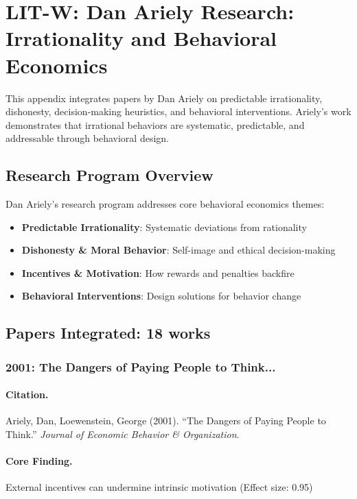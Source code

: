\section{LIT-W: Dan Ariely Research: Irrationality and Behavioral Economics}
\label{app:litw}

This appendix integrates papers by Dan Ariely on predictable irrationality,
dishonesty, decision-making heuristics, and behavioral interventions. Ariely's work demonstrates
that irrational behaviors are systematic, predictable, and addressable through behavioral design.

\subsection{Research Program Overview}

Dan Ariely's research program addresses core behavioral economics themes:

\begin{itemize}
  \item \textbf{Predictable Irrationality}: Systematic deviations from rationality
  \item \textbf{Dishonesty & Moral Behavior}: Self-image and ethical decision-making
  \item \textbf{Incentives & Motivation}: How rewards and penalties backfire
  \item \textbf{Behavioral Interventions}: Design solutions for behavior change
\end{itemize}

\subsection{Papers Integrated: 18 works}

\subsubsection{2001: The Dangers of Paying People to Think...}

\paragraph{Citation.}
Ariely, Dan, Loewenstein, George (2001). ``The Dangers of Paying People to Think.''
\textit{Journal of Economic Behavior & Organization}.

\paragraph{Core Finding.}
External incentives can undermine intrinsic motivation (Effect size: 0.95)

